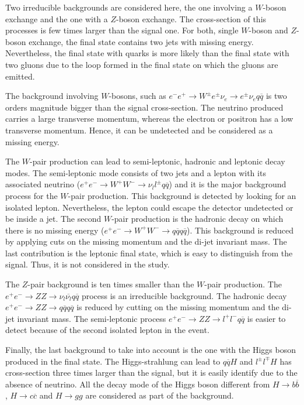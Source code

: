     Two irreducible backgrounds are considered here, the one involving a $W$-boson exchange and the one with a $Z$-boson exchange.
    The cross-section of this processes is few times larger than the signal one.
    For both, single $W$-boson and $Z$-boson exchange, the final state contains two jets with missing energy.
    Nevertheless, the final state with quarks is more likely than the final state with two gluons due to the loop formed in the final state on which the gluons are emitted.

    The background involving $W$-bosons, such as $e^{-}e^{+} \rightarrow W^{\pm}e^{\pm}\nu_{e} \rightarrow e^{\pm}\nu_{e}q\overline{q}$ is two orders magnitude bigger than the signal cross-section.
    The neutrino produced carries a large transverse momentum, whereas the electron or positron has a low transverse momentum.
    Hence, it can be undetected and be considered as a missing energy.
    
    The $W$-pair production can lead to semi-leptonic, hadronic and leptonic decay modes.
    The semi-leptonic mode consists of two jets and a lepton with its associated neutrino ($e^{+}e^{-} \rightarrow W^+W^- \rightarrow \nu_{l}l^{\pm}q\overline{q}$) and it is the major background process for the $W$-pair production.
    This background is detected by looking for an isolated lepton.
    Nevertheless, the lepton could escape the detector undetected or be inside a jet.
    The second $W$-pair production is the hadronic decay on which there is no missing energy ($e^{+}e^{-} \rightarrow W^+W^- \rightarrow q\overline{q} q\overline{q}$).
    This background is reduced by applying cuts on the missing momentum and the di-jet invariant mass.
    The last contribution is the leptonic final state, which is easy to distinguish from the signal.
    Thus, it is not considered in the study. 

    The $Z$-pair background is ten times smaller than the $W$-pair production.
    The  $e^+e^- \rightarrow ZZ \rightarrow \nu_{l}\overline{\nu_{l}}q \overline{q}$ process is an irreducible background.
    The hadronic decay $e^+e^- \rightarrow ZZ \rightarrow q\overline{q} q\overline{q}$ is reduced by cutting on the missing momentum and the di-jet invariant mass.
    The semi-leptonic process $e^+e^- \rightarrow ZZ \rightarrow l^+l^- q\overline{q}$ is easier to detect because of the second isolated lepton in the event.

    Finally, the last background to take into account is the one with the Higgs boson produced in the final state.
    The Higgs-strahlung can lead to $q\overline{q}H$ and $l^{\pm}l^{\mp}H$ has cross-section three times larger than the signal, but it is easily identify due to the absence of neutrino.
    All the decay mode of the Higgs boson different from $H \rightarrow b\overline{b}$, $H \rightarrow c\overline{c}$ and $H \rightarrow gg$ are considered as part of the background.

